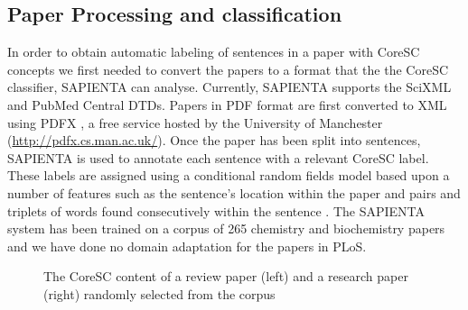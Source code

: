 \documentclass{svmult}
\begin{document}
\subsection*{Paper Processing and classification}
In order to obtain automatic labeling of sentences in a paper with
CoreSC concepts we first needed to convert the papers to a format that
the the CoreSC classifier, SAPIENTA can analyse.  Currently, SAPIENTA
supports the SciXML and PubMed Central DTDs.  Papers in PDF format are
first converted to XML using PDFX %
, a free service hosted by the University of Manchester
(\url{http://pdfx.cs.man.ac.uk/}). Once the paper has been split into
sentences, SAPIENTA is used to annotate each sentence with a relevant
CoreSC label. These labels are assigned using a conditional random
fields model based upon a number of features such as the sentence's
location within the paper and pairs and triplets of words found
consecutively within the sentence \cite{Liakata2012}.  The SAPIENTA
system has been trained on a corpus of 265 chemistry and biochemistry
papers and we have done no domain adaptation for the papers in PLoS.



\begin{figure}[t]

\centering

\caption{The CoreSC content of a review paper (left) and a research paper (right) randomly selected from the corpus}

\vspace{-20pt}
\label{fig:coresc_pies} 
\end{figure}
\end{document}
